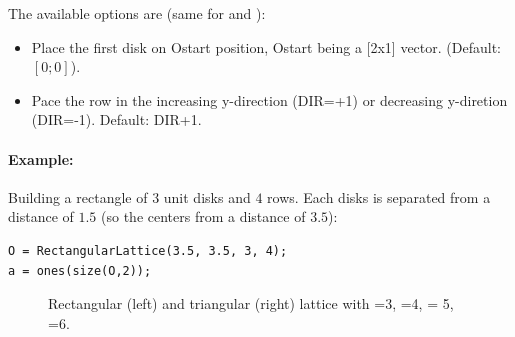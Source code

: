 The available options are (same for \RectangularLattice and \TriangularLattice):
\begin{itemize}
\item {}
Place the first disk on Ostart position, Ostart being a [2x1] vector. (Default: $[0;0]$).
 \item {}
Pace the row in the increasing y-direction (DIR=+1) or decreasing y-diretion (DIR=-1). Default: DIR+1.
\end{itemize}

\paragraph{Example:} Building a rectangle of $3$ unit disks and $4$ rows. Each disks is separated from a distance of $1.5$ (so the centers from a distance of $3.5$):
\begin{lstlisting}
O = RectangularLattice(3.5, 3.5, 3, 4);
a = ones(size(O,2));
\end{lstlisting}

\begin{figure}
\centering
{}\quad{}
\caption{Rectangular (left) and triangular (right) lattice with =3, =4,  = 5, =6.}
\label{fig:lattices}
\end{figure}



